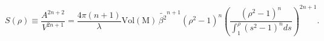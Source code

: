 \begin{equation}
S(\rho)\equiv\frac{A^{2n+2}}{V^{2n+1}}=\frac{4\pi(n+1)}{\lambda}\mathrm{Vol(M)}\,\tilde{\beta^2}^{n+1}(\rho^2-1)^n
\left(\frac{(\rho^2-1)^n}{\int_1^{\rho} (s^2-1)^n ds}\right)^{2n+1}.
\end{equation}

